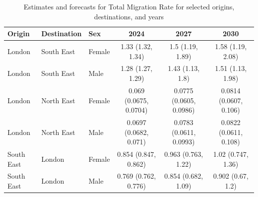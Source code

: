\begin{table}[ht]
\centering
\caption{Estimates and forecasts for Total Migration Rate for selected origins, destinations, and years} 
\label{tab:tmr}
\begingroup\small
\begin{tabular}{lllccc}
  \hline
Origin & Destination & Sex & 2024 & 2027 & 2030 \\ 
  \hline
London & South East & Female & 1.33 (1.32, 1.34) &  1.5 (1.19, 1.89) & 1.58 (1.19, 2.08) \\ 
  London & South East & Male & 1.28 (1.27, 1.29) & 1.43 (1.13,  1.8) & 1.51 (1.13, 1.98) \\ 
  London & North East & Female & 0.069 (0.0675, 0.0704) & 0.0775 (0.0605, 0.0986) & 0.0814 (0.0607, 0.106) \\ 
  London & North East & Male & 0.0697 (0.0682, 0.071) & 0.0783 (0.0611, 0.0993) & 0.0822 (0.0611, 0.108) \\ 
  South East & London & Female & 0.854 (0.847, 0.862) & 0.963 (0.763, 1.22) & 1.02 (0.747, 1.36) \\ 
  South East & London & Male & 0.769 (0.762, 0.776) & 0.854 (0.682, 1.09) & 0.902 (0.67,  1.2) \\ 
   \hline
\end{tabular}
\endgroup
\end{table}
